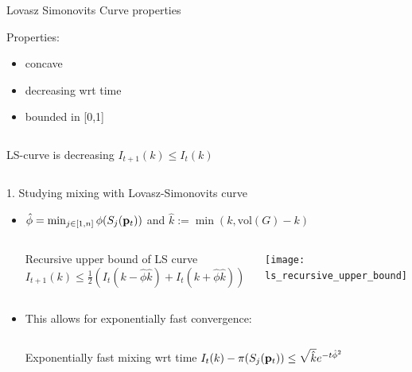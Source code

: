 \documentclass[../main.tex]{subfiles}
\begin{document}
	\begin{frame}{Lovasz Simonovits Curve properties}
    
          	Properties: 
          	\begin{itemize}
          		\item concave
          		\item decreasing wrt time
          		\item bounded in [0,1]
          	\end{itemize}
     
         
     
		\begin{columns}
			\begin{block}{LS-curve is decreasing} 
				$I_{t+1}(k) \leq I_{t}(k)$
			\end{block}
    	\end{columns}
    \end{frame}
    
    \begin{frame}{1. Studying mixing with Lovasz-Simonovits curve}
        \begin{itemize}
            \item $\hat{\phi} = \min_{j\in[1,n]}\phi(S_j(\bold{p}_t))$ and $\hat{k}:=\min(k, \text{vol}(G)-k)$
                \begin{columns}
                    \begin{block}{Recursive upper bound of LS curve}
                        $I_{t+1}(k) \leq \frac{1}{2}(I_t(k-\hat{\phi} \hat{k}) + I_t(k+\hat{\phi} \hat{k}))$
                    \end{block}
                	\column{0.5\textwidth}
                	\texttt{[image: ls\_recursive\_upper\_bound]}
                \end{columns}
           \item This allows for exponentially fast convergence:
                \begin{columns}
                    \begin{block}{Exponentially fast mixing wrt time}
                        $I_{t}(k) - \pi(S_j(\bold{p}_t)) \leq \sqrt{\hat{k}}e^{-t \hat{\phi}^2}$
                    \end{block}
                \end{columns}
        \end{itemize}
    \end{frame}
    
\end{document}
